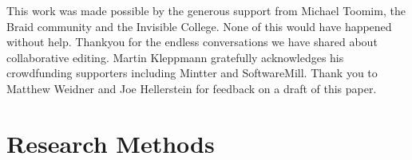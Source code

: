 \documentclass[sigplan,10pt]{acmart}
\begin{document}
\begin{acks}
  This work was made possible by the generous support from Michael Toomim, the Braid community and the Invisible College. None of this would have happened without help. Thankyou for the endless conversations we have shared about collaborative editing.
  Martin Kleppmann gratefully acknowledges his crowdfunding supporters including Mintter and SoftwareMill.
  Thank you to Matthew Weidner and Joe Hellerstein for feedback on a draft of this paper.
\end{acks}




\appendix
\section{Research Methods}
\end{document}
